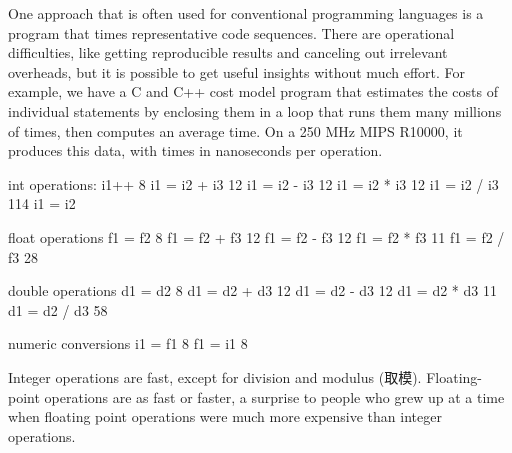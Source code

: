 One approach that is often used for conventional programming languages is a
program that times representative code sequences. There are operational
difficulties, like getting reproducible results and canceling out
irrelevant overheads, but it is possible to get useful insights without
much effort. For example, we have a C and C++ cost model program that
estimates the costs of individual statements by enclosing them in a loop
that runs them many millions of times, then computes an average time. On a
250 MHz MIPS R10000, it produces this data, with times in nanoseconds per
operation.
\begin{wellcode}
    int operations:
        i1++                    8
        i1 = i2 + i3           12
        i1 = i2 - i3           12
        i1 = i2 * i3           12
        i1 = i2 / i3          114
        i1 = i2 %

    float operations
        f1 = f2                 8
        f1 = f2 + f3           12
        f1 = f2 - f3           12
        f1 = f2 * f3           11
        f1 = f2 / f3           28

    double operations
        d1 = d2                 8
        d1 = d2 + d3           12
        d1 = d2 - d3           12
        d1 = d2 * d3           11
        d1 = d2 / d3           58

    numeric conversions
        i1 = f1                 8
        f1 = i1                 8
\end{wellcode}
Integer operations are fast, except for division and modulus (取模).
Floating-point operations are as fast or faster, a surprise to people who
grew up at a time when floating point operations were much more expensive
than integer operations.

